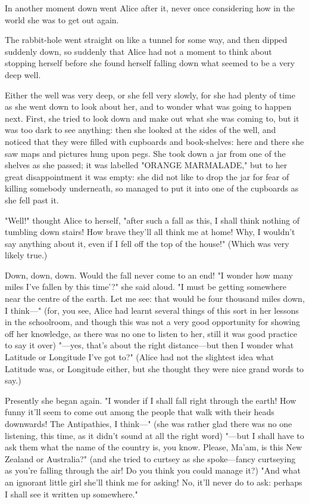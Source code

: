 \documentclass[aps,prb,amsmath,twocolumn,amssymb,titlepage]{revtex4-2}
\begin{document}
In another moment down went Alice after it, never once considering how in the world she was to get out again.

The rabbit-hole went straight on like a tunnel for some way, and then dipped suddenly down, so suddenly that Alice had not a moment to think about stopping herself before she found herself falling down what seemed to be a very deep well.

Either the well was very deep, or she fell very slowly, for she had plenty of time as she went down to look about her, and to wonder what was going to happen next. First, she tried to look down and make out what she was coming to, but it was too dark to see anything: then she looked at the sides of the well, and noticed that they were filled with cupboards and book-shelves: here and there she saw maps and pictures hung upon pegs. She took down a jar from one of the shelves as she passed; it was labelled "ORANGE MARMALADE," but to her great disappointment it was empty: she did not like to drop the jar for fear of killing somebody underneath, so managed to put it into one of the cupboards as she fell past it.

"Well!" thought Alice to herself, "after such a fall as this, I shall think nothing of tumbling down stairs! How brave they'll all think me at home! Why, I wouldn't say anything about it, even if I fell off the top of the house!" (Which was very likely true.)

Down, down, down. Would the fall never come to an end! "I wonder how many miles I've fallen by this time'?" she said aloud. "I must be getting somewhere near the centre of the earth. Let me see: that would be four thousand miles down, I think—" (for, you see, Alice had learnt several things of this sort in her lessons in the schoolroom, and though this was not a very good opportunity for showing off her knowledge, as there was no one to listen to her, still it was good practice to say it over) "—yes, that's about the right distance—but then I wonder what Latitude or Longitude I've got to?" (Alice had not the slightest idea what Latitude was, or Longitude either, but she thought they were nice grand words to say.)

Presently she began again. "I wonder if I shall fall right through the earth! How funny it'll seem to come out among the people that walk with their heads downwards! The Antipathies, I think—" (she was rather glad there was no one listening, this time, as it didn't sound at all the right word) "—but I shall have to ask them what the name of the country is, you know. Please, Ma'am, is this New Zealand or Australia?" (and she tried to curtsey as she spoke—fancy curtseying as you're falling through the air! Do you think you could manage it?) "And what an ignorant little girl she'll think me for asking! No, it'll never do to ask: perhaps I shall see it written up somewhere."
\end{document}
